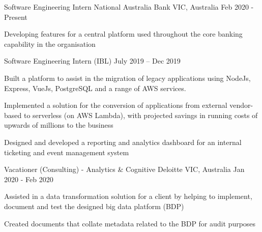 

\begin{cventries}

  \cventry
    {Software Engineering Intern} %
    {National Australia Bank} %
    {VIC, Australia} %
    {Feb 2020 - Present} %
    { 
      \begin{cvitems} %
        \item {Developing features for a central platform used throughout the core banking capability in the organisation}
      \end{cvitems}
    }
    \cventry
    {Software Engineering Intern (IBL)} %
    {} %
    {} %
    {July 2019 – Dec 2019} %
    {  
      \begin{cvitems} %
        \item {Built a platform to assist in the migration of legacy applications using NodeJs, Express, VueJs, PostgreSQL and a range of AWS services.}
        \item {Implemented a solution for the conversion of applications from external vendor-based to serverless (on AWS Lambda), with projected savings in running costs of upwards of millions to the business}
        \item {Designed and developed a reporting and analytics dashboard for an internal ticketing and event management system}
      \end{cvitems}
    }


  \cventry
    {Vacationer (Consulting) - Analytics \& Cognitive} %
    {Deloitte} %
    {VIC, Australia} %
    {Jan 2020 - Feb 2020} %
    {
      \begin{cvitems} %
        \item {Assisted in a data transformation solution for a client by helping to implement, document and test the designed big data platform (BDP)}
        \item {Created documents that collate metadata related to the BDP for audit purposes}
      \end{cvitems}
    }


\end{cventries}
